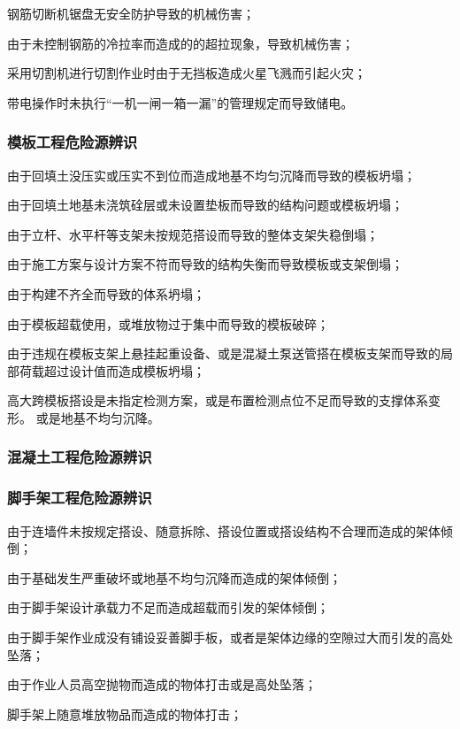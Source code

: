  钢筋切断机锯盘无安全防护导致的机械伤害；

 由于未控制钢筋的冷拉率而造成的的超拉现象，导致机械伤害；

 采用切割机进行切割作业时由于无挡板造成火星飞溅而引起火灾；

 带电操作时未执行“一机一闸一箱一漏”的管理规定而导致储电。

\subsubsection{模板工程危险源辨识}

 由于回填土没压实或压实不到位而造成地基不均匀沉降而导致的模板坍塌；

 由于回填土地基未浇筑硂层或未设置垫板而导致的结构问题或模板坍塌；

 由于立杆、水平杆等支架未按规范搭设而导致的整体支架失稳倒塌；

 由于施工方案与设计方案不符而导致的结构失衡而导致模板或支架倒塌；

 由于构建不齐全而导致的体系坍塌；

 由于模板超载使用，或堆放物过于集中而导致的模板破碎；

 由于违规在模板支架上悬挂起重设备、或是混凝土泵送管搭在模板支架而导致的局部荷载超过设计值而造成模板坍塌；

 高大跨模板搭设是未指定检测方案，或是布置检测点位不足而导致的支撑体系变形。
或是地基不均匀沉降。

\subsubsection{混凝土工程危险源辨识}
\subsubsection{脚手架工程危险源辨识}

 由于连墙件未按规定搭设、随意拆除、搭设位置或搭设结构不合理而造成的架体倾倒；

 由于基础发生严重破坏或地基不均匀沉降而造成的架体倾倒；

 由于脚手架设计承载力不足而造成超载而引发的架体倾倒；

 由于脚手架作业成没有铺设妥善脚手板，或者是架体边缘的空隙过大而引发的高处坠落；

 由于作业人员高空抛物而造成的物体打击或是高处坠落；

 脚手架上随意堆放物品而造成的物体打击；

